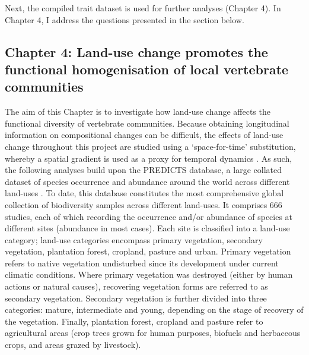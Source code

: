 Next, the compiled trait dataset is used for further analyses (Chapter 4). In Chapter 4, I address the questions presented in the section below.

\subsection{Chapter 4: Land-use change promotes the functional homogenisation of local vertebrate communities}

The aim of this Chapter is to investigate how land-use change affects the functional diversity of vertebrate communities. Because obtaining longitudinal information on compositional changes can be difficult, the effects of land-use change throughout this project are studied using a ‘space-for-time’ substitution, whereby a spatial gradient is used as a proxy for temporal dynamics \citep{depalma2018}. As such, the following analyses  build upon the PREDICTS database, a large collated dataset of species occurrence and abundance around the world across different land-uses \citep{Hudson2014, Hudson2017}. To date, this database constitutes the most comprehensive global collection of biodiversity samples across different land-uses. It comprises 666 studies, each of which recording the occurrence and/or abundance  of species at different sites (abundance in most cases). Each site is classified into a land-use category; land-use categories encompass primary vegetation, secondary vegetation, plantation forest, cropland, pasture and urban. Primary vegetation refers to native vegetation undisturbed since its development under current climatic conditions. Where primary vegetation was destroyed (either by human actions or natural causes), recovering vegetation forms are referred to as secondary vegetation. Secondary vegetation is further divided into three categories: mature, intermediate and young, depending on the stage of recovery of the vegetation.
Finally, plantation forest, cropland and pasture refer to agricultural areas (crop trees grown for human purposes, biofuels and herbaceous crops, and areas grazed by livestock).

